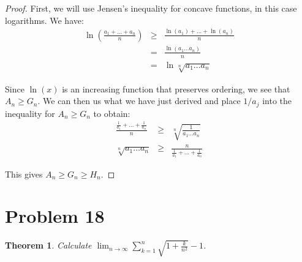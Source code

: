 \documentclass[psamsfonts]{amsart}
\newtheorem{thm}{Theorem}[section]
\theoremstyle{definition}
\theoremstyle{remark}
\numberwithin{equation}{section}
\begin{document}
\begin{proof}
First, we will use Jensen's inequality for concave functions, in this case logarithms. We have:
\begin{eqnarray}
\ln \left(\frac{a_1 + \ldots + a_n}{n} \right) &\geq& \frac{\ln \left( a_1 \right) + \ldots + \ln \left( a_n \right)}{n} \\
&=& \frac{\ln (a_1 \ldots a_n)}{n} \\
&=& \ln \sqrt[n]{a_1 \ldots a_n} 
\end{eqnarray}

Since $\ln(x)$ is an increasing function that preserves ordering, we see that $A_n \geq G_n$. We can then us what we have just derived and place $1/a_j$ into the inequality for $A_n \geq G_n$ to obtain:
\begin{eqnarray}
\frac{\frac{1}{a_1} + \ldots + \frac{1}{a_n}}{n} &\geq& \sqrt[n]{\frac{1}{a_1 \ldots a_n}} \\
\sqrt[n]{a_1 \ldots a_n} &\geq& \frac{n}{\frac{1}{a_1} + \ldots + \frac{1}{a_n}}
\end{eqnarray} 

This gives $A_n \geq G_n \geq H_n$.
\end{proof}

\section{Problem 18}

\begin{thm}
Calculate $\lim_{n \to \infty} \sum_{k=1}^n \sqrt{1+ \frac{k}{n^2}} - 1$. 
\end{thm}
\end{document}
